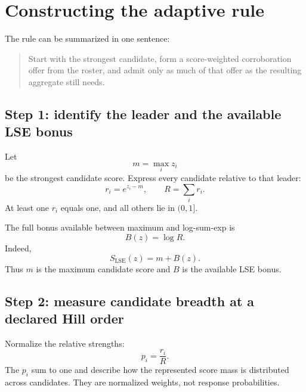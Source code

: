\documentclass[11pt]{article}
\newcommand{\LSE}{\operatorname{LSE}}
\begin{document}
\section{Constructing the adaptive rule}

The rule can be summarized in one sentence:

\begin{quote}
Start with the strongest candidate, form a score-weighted corroboration offer
from the roster, and admit only as much of that offer as the resulting
aggregate still needs.
\end{quote}

\subsection{Step 1: identify the leader and the available LSE bonus}

Let
\begin{equation}
m=\max_i z_i
\end{equation}
be the strongest candidate score. Express every candidate relative to that
leader:
\begin{equation}
r_i=e^{z_i-m},
\qquad
R=\sum_i r_i.
\end{equation}
At least one $r_i$ equals one, and all others lie in $(0,1]$.

The full bonus available between maximum and log-sum-exp is
\begin{equation}
B(z)=\log R.
\end{equation}
Indeed,
\begin{equation}
S_{\LSE}(z)=m+B(z).
\end{equation}
Thus $m$ is the maximum candidate score and $B$ is the available LSE bonus.

\subsection{Step 2: measure candidate breadth at a declared Hill order}

Normalize the relative strengths:
\begin{equation}
p_i=\frac{r_i}{R}.
\end{equation}
The $p_i$ sum to one and describe how the represented score mass is distributed
across candidates. They are normalized weights, not response probabilities.
\end{document}
